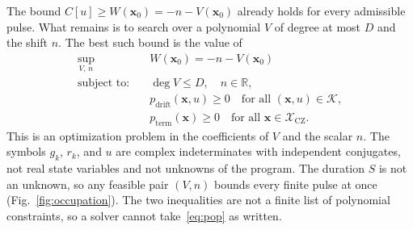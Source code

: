 \documentclass[aps,prx,reprint,nofootinbib,longbibliography,floatfix]{revtex4-2}
\theoremstyle{plain}
\theoremstyle{remark}
\newcommand{\xv}{\boldsymbol{x}}
\begin{document}
The bound $C[u]\ge W(\xv_0)=-n-V(\xv_0)$ already holds for every admissible pulse.
What remains is to search over a polynomial $V$ of degree at most $D$ and the
shift $n$. The best such bound is the value of
\begin{equation}
\begin{aligned}
\sup_{V,\,n}
& \quad W(\xv_0)=-n-V(\xv_0) \\
\text{subject to:}
& \quad \deg V\le D,\quad n\in\mathbb{R}, \\
& \quad p_{\mathrm{drift}}(\xv,u)\ge0\quad\text{for all }(\xv,u)\in\mathcal K, \\
& \quad p_{\mathrm{term}}(\xv)\ge0\quad\text{for all }\xv\in\mathcal{X}_{\mathrm{CZ}}.
\end{aligned}
\label{eq:pop}
\end{equation}
This is an optimization problem in the coefficients of $V$ and the scalar $n$.
The symbols $g_k$, $r_k$, and $u$ are complex indeterminates with independent
conjugates, not real state variables and not unknowns of the program. The
duration $S$ is not an unknown, so any feasible pair $(V,n)$ bounds every
finite pulse at once (Fig.~\ref{fig:occupation}). The two inequalities are not
a finite list of polynomial constraints, so a solver cannot take~\eqref{eq:pop}
as written.
\end{document}
